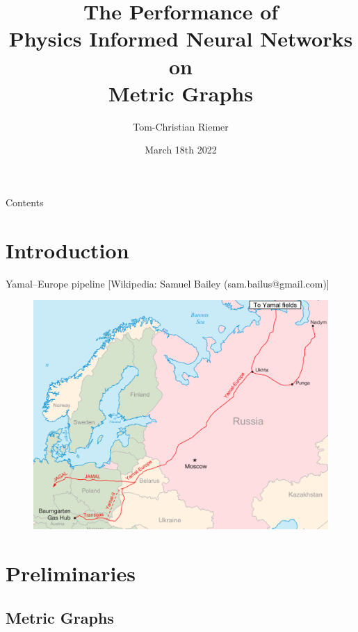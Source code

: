 \documentclass[9pt]{beamer}
\title{The Performance of \\ Physics Informed Neural Networks on \\ Metric Graphs}
\author{Tom-Christian Riemer}
\institute{TU Chemnitz}
\date{March 18th 2022}
\begin{document}
\maketitle

\begin{frame}{Contents}
  \tableofcontents[hideallsubsections]
\end{frame}

\section{Introduction}

\begin{frame}{Yamal–Europe pipeline}
    \vspace{-1\baselineskip}\hfill{\tiny{[Wikipedia: Samuel Bailey (sam.bailus@gmail.com)]}}
    \begin{figure}[H]
        \begin{center}
            \includegraphics[scale=0.45]{img/Yamal-europe.png}
        \end{center}
    \end{figure}
\end{frame}

\section{Preliminaries}

\subsection{Metric Graphs}
\end{document}
